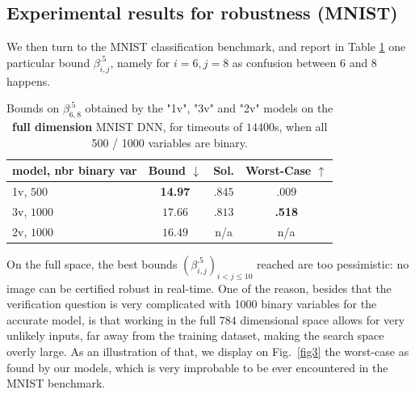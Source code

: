 	\subsection{Experimental results for robustness (MNIST)}
	
We then turn to the MNIST classification benchmark, and report 
in Table \ref{table.mnist} one particular bound $\beta^{.5}_{i,j}$, namely for $i=6,j=8$ as confusion between 6 and 8 happens.
	
	\begin{table}[h!]
		\centering
	\begin{tabular}{||l||c|c|c||}\hline\hline
		model, nbr binary var &        Bound $\downarrow$ &  Sol. &      Worst-Case $\uparrow$ \\\hline \hline
		1v, $500$ & {\bf 14.97} & $.845$ & $.009$ \\\hline 
		3v, $1000$ & $17.66$ & $.813$ & {\bf .518} \\\hline 
	    2v, $1000$ & $16.49$ & n/a & n/a \\\hline\hline	 
	\end{tabular}
	\caption{Bounds on $\beta^{.5}_{6,8}$ 
	obtained by the "1v", "3v" and "2v" models 
	on the {\bf full dimension} MNIST DNN, 
	for timeouts of $14400$s, when all 500 / 1000 variables are binary.}
	\label{table.mnist}
\end{table}

On the full space, the best bounds $(\beta^{.5}_{i,j})_{i < j \leq 10}$ reached are too pessimistic: no image can be certified robust in real-time. One of the reason, besides that the verification question is very complicated with 1000 binary variables for the accurate model, is that working in the full $784$ dimensional space allows for very unlikely inputs, far away from the training dataset, making the search space overly large. As an illustration of that, we display on Fig.~\ref{fig3} the worst-case as found by our models, which is very improbable to be ever encountered in the MNIST benchmark.

